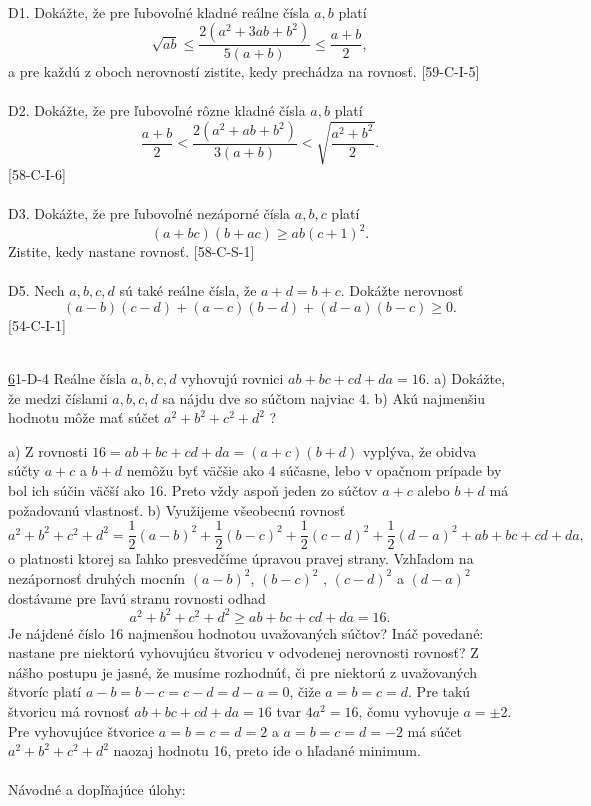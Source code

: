 \\
D1. Dokážte, že pre ľubovoľné kladné reálne čísla $a, b$ platí
$$\sqrt{ab}\leq \frac{2(a^2 +3ab+b^2)}{5(a+b)}\leq \frac{a+b}{2},$$
a pre každú z oboch nerovností zistite, kedy prechádza na rovnosť. [59-C-I-5]\\
\\
D2. Dokážte, že pre ľubovoľné rôzne kladné čísla $a, b$ platí
$$ \frac{a+b}{2}<\frac{2(a^2 +ab+b^2)}{3(a+b)}<\sqrt{\frac{a^2+b^2}{2}}.$$
[58-C-I-6]\\
\\
D3. Dokážte, že pre ľubovoľné nezáporné čísla $a, b, c$ platí $$(a + bc)(b + ac) \geq ab(c + 1)^2.$$
Zistite, kedy nastane rovnosť. [58-C-S-1]\\
\\
D5. Nech $a, b, c, d$ sú také reálne čísla, že $a + d = b + c$. Dokážte nerovnosť
$$(a - b)(c - d) + (a - c)(b - d) + (d - a)(b - c) \geq 0.$$
[54-C-I-1]\\
\\
\begin{tcolorbox}[breakable,notitle,boxrule=0pt,colback=light-gray,colframe=light-gray]\ul 61-D-4
Reálne čísla $a, b, c, d$ vyhovujú rovnici $ab + bc + cd + da = 16$.
a) Dokážte, že medzi číslami $a, b, c, d$ sa nájdu dve so súčtom najviac 4.
b) Akú najmenšiu hodnotu môže mať súčet $a^2 + b^2 + c^2 + d^2$ ?

\end{tcolorbox}

\rie a) Z rovnosti $16 = ab + bc + cd + da = (a + c)(b + d)$ vyplýva, že obidva súčty $a + c$ a $b + d$ nemôžu byť väčšie ako 4 súčasne, lebo v opačnom prípade by bol ich súčin väčší ako 16. Preto vždy aspoň jeden zo súčtov $a + c$ alebo $b + d$ má požadovanú
vlastnosť.
b) Využijeme všeobecnú rovnosť $$a^2+ b^2+ c^2+ d^2=\frac{1}{2}(a - b)^2+\frac{1}{2}(b - c)^2+\frac{1}{2}(c - d)^2+\frac{1}{2}(d - a)^2+ ab + bc + cd + da,$$
o platnosti ktorej sa ľahko presvedčíme úpravou pravej strany. Vzhľadom na nezápornosť druhých mocnín $(a-b)^2 $, $(b-c)^2$ , $(c-d)^2$ a $(d-a)^2$ dostávame pre ľavú stranu rovnosti odhad $$a^2+ b^2+ c^2+ d^2\geq ab + bc + cd + da = 16.$$
Je nájdené číslo 16 najmenšou hodnotou uvažovaných súčtov? Ináč povedané: nastane pre niektorú vyhovujúcu štvoricu v odvodenej nerovnosti rovnosť? Z nášho postupu je jasné, že musíme rozhodnúť, či pre niektorú z uvažovaných štvoríc platí $a - b = b - c = c - d = d - a = 0$, čiže $a = b = c = d$. Pre takú štvoricu má rovnosť $ab + bc + cd + da = 16$ tvar $4a^2 = 16$, čomu vyhovuje $a = \pm 2$. Pre vyhovujúce štvorice
$a = b = c = d = 2$ a $a = b = c = d = -2$ má súčet $a^2 + b^2 + c^2 + d^2$ naozaj hodnotu 16, preto ide o hľadané minimum.\\
\\
Návodné a dopľňajúce úlohy:\\

